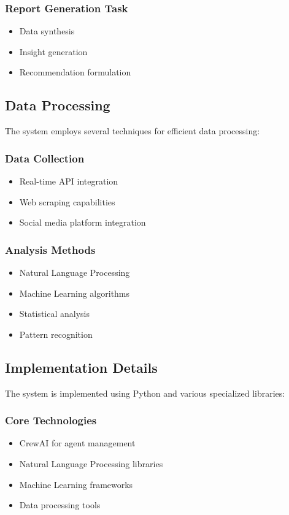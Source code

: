 \subsubsection{Report Generation Task}
\begin{itemize}
    \item Data synthesis
    \item Insight generation
    \item Recommendation formulation
\end{itemize}

\subsection{Data Processing}
The system employs several techniques for efficient data processing:

\subsubsection{Data Collection}
\begin{itemize}
    \item Real-time API integration
    \item Web scraping capabilities
    \item Social media platform integration
\end{itemize}

\subsubsection{Analysis Methods}
\begin{itemize}
    \item Natural Language Processing
    \item Machine Learning algorithms
    \item Statistical analysis
    \item Pattern recognition
\end{itemize}

\subsection{Implementation Details}
The system is implemented using Python and various specialized libraries:

\subsubsection{Core Technologies}
\begin{itemize}
    \item CrewAI for agent management
    \item Natural Language Processing libraries
    \item Machine Learning frameworks
    \item Data processing tools
\end{itemize}

